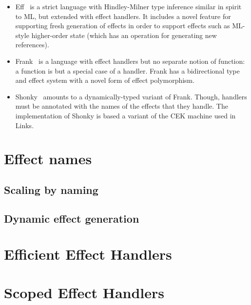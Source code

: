 \documentclass[adraft]{eptcs}
\begin{document}
\begin{itemize}
\item Eff~\cite{BauerP15} is a strict language with Hindley-Milner
  type inference similar in spirit to ML, but extended with effect
  handlers.
%
  It includes a novel feature for supporting fresh generation of
  effects in order to support effects such as ML-style higher-order
  state (which has an operation for generating new references).

\item Frank~\cite{LindleyMM16} is a language with effect handlers but
  no separate notion of function: a function is but a special case of
  a handler. Frank has a bidirectional type and effect system with a
  novel form of effect polymorphism.
  

\item Shonky~\cite{McBride16} amounts to a dynamically-typed variant
  of Frank. Though, handlers must be annotated with the names of the
  effects that they handle. The implementation of Shonky is based a
  variant of the CEK machine used in Links.
\end{itemize}

\section{Effect names}
\subsection{Scaling by naming}
\subsection{Dynamic effect generation}

\section{Efficient Effect Handlers}

\section{Scoped Effect Handlers}

\nocite{*}


\end{document}
